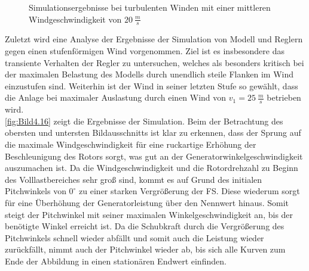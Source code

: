 \begin{figure}[H]
   \centering
   \caption[Simulationsergebnisse bei schnellen turbulenten Winden]{Simulationsergebnisse bei turbulenten Winden mit einer mittleren Windgeschwindigkeit von $\SI{20}{\frac{m}{s}}$}
   \label{fig:Bild4.15}
\end{figure}


Zuletzt wird eine Analyse der Ergebnisse der Simulation von Modell und Reglern gegen einen stufenförmigen Wind vorgenommen. Ziel ist es insbesondere das transiente Verhalten der Regler zu untersuchen, welches als besonders kritisch bei der maximalen Belastung des Modells durch unendlich steile Flanken im Wind einzustufen sind. Weiterhin ist der Wind in seiner letzten Stufe so gewählt, dass die Anlage bei maximaler Auslastung durch einen Wind von $v_1 = \SI{25}{\frac{m}{s}}$ betrieben wird.\\
\autoref{fig:Bild4.16} zeigt die Ergebnisse der Simulation. Beim der Betrachtung des obersten und untersten Bildausschnitts ist klar zu erkennen, dass der Sprung auf die maximale Windgeschwindigkeit für eine ruckartige Erhöhung der Beschleunigung des Rotors sorgt, was gut an der Generatorwinkelgeschwindigkeit auszumachen ist. Da die Windgeschwindigkeit und die Rotordrehzahl zu Beginn des Volllastbereiches sehr groß sind, kommt es auf Grund des initialen Pitchwinkels von $0^\circ$ zu einer starken Vergrößerung der \ac{FS}. Diese wiederum sorgt für eine Überhöhung der Generatorleistung über den Nennwert hinaus. Somit steigt der Pitchwinkel mit seiner maximalen Winkelgeschwindigkeit an, bis der benötigte Winkel erreicht ist. Da die Schubkraft durch die Vergrößerung des Pitchwinkels schnell wieder abfällt und somit auch die Leistung wieder zurückfällt, nimmt auch der Pitchwinkel wieder ab, bis sich alle Kurven zum Ende der Abbildung in einen stationären Endwert einfinden.

